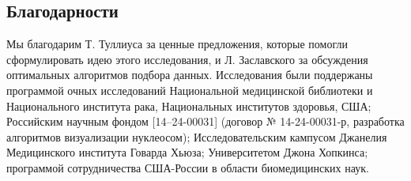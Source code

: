 \subsection{Благодарности}
Мы благодарим Т. Туллиуса за ценные предложения, которые помогли сформулировать идею этого исследования, и Л. Заславского за обсуждения оптимальных алгоритмов подбора данных.
Исследования были поддержаны программой очных исследований Национальной медицинской библиотеки и Национального института рака, Национальных институтов здоровья, США; Российским научным фондом [14–24-00031] (договор № 14-24-00031-р, разработка алгоритмов визуализации нуклеосом); Исследовательским кампусом Джанелия Медицинского института Говарда Хьюза;  Университетом Джона Хопкинса; программой сотрудничества США-России в области биомедицинских наук.



